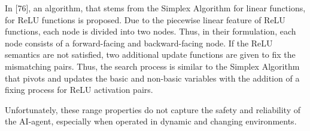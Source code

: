 In [76], an algorithm, that stems from the Simplex Algorithm for linear functions, for ReLU functions is proposed. Due to the piecewise linear feature of ReLU functions, each node is divided into two nodes. Thus, in their formulation, each node consists of a forward-facing and backward-facing node. If the ReLU semantics are not satisfied, two additional update functions are given to fix the mismatching pairs. Thus, the search process is similar to the Simplex Algorithm that pivots and updates the basic and non-basic variables with the addition of a fixing process for ReLU activation pairs.




Unfortunately, these range properties do not capture the safety and reliability of the AI-agent, especially when operated in dynamic and changing environments.










